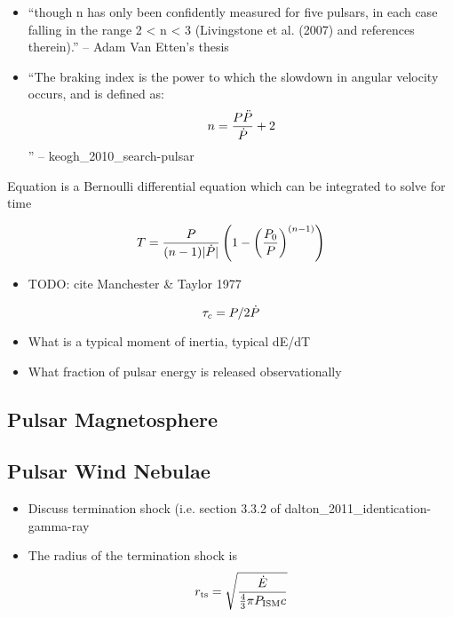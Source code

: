 \begin{itemize}
  \item ``though n has only been confidently measured for five pulsars,
  in each case falling in the range 2 < n < 3 (Livingstone et al. (2007)
  and references therein).'' -- Adam Van Etten's thesis
\item ``The braking index is the power to which the slowdown in angular
velocity occurs, and is defined as:
  \begin{equation}
    n = \frac{P \ddot{P}}{\dot{P}} + 2
  \end{equation}
  '' -- keogh\_2010\_search-pulsar
\end{itemize}

Equation  is
a Bernoulli differential equation which can be integrated to solve for time

\begin{equation}
  T = \frac{P}{(n-1) |\dot{P}|}
  \left(
  1-\left(\frac{P_0}{P}\right)^{(n-1)}
  \right)
\end{equation}

\begin{itemize}
  \item TODO: cite Manchester \& Taylor 1977
\end{itemize}



\begin{equation}
  \tau_c = P/2\dot{P}
\end{equation}


\begin{itemize}
  \item What is a typical moment of inertia, typical dE/dT
  \item What fraction of pulsar energy is released observationally
\end{itemize}

\subsection{Pulsar Magnetosphere}

\subsection{Pulsar Wind Nebulae}

\begin{itemize}
  \item Discuss termination shock (i.e. section 3.3.2 of dalton\_2011\_identication-gamma-ray
  \item The radius of the termination shock is
    \begin{equation}
      r_\text{ts} = \sqrt{\frac{\dot{E}}{\tfrac{4}{3}\pi P_\text{ISM} c}}
    \end{equation}

\end{itemize}



